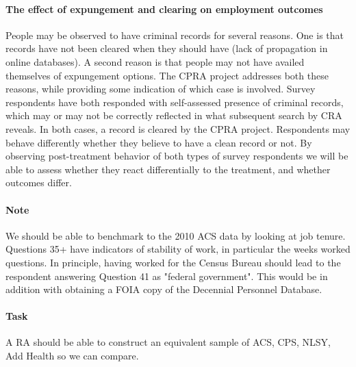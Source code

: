 \documentclass[letterpaper,man,biblatex]{apa6}
\begin{document}
\paragraph{The effect of expungement and clearing on employment outcomes} People may be observed to have criminal records for several reasons. One is that records have not been cleared when they should have (lack of propagation in online databases). A second reason is that people may not have availed themselves of expungement options. The CPRA project addresses both these reasons, while providing some indication of which case is involved. Survey respondents have both responded with self-assessed presence of criminal records, which may or may not be correctly reflected in what subsequent search by \ac{CRA} reveals. In both cases, a record is cleared by the CPRA project. Respondents may behave differently whether they believe to have a clean record or not. By observing post-treatment behavior of both types of survey respondents we will be able to assess whether they react differentially to the treatment, and whether outcomes differ. 

\paragraph{Note} We should be able to benchmark to the 2010 \ac{ACS} data by looking at job tenure. Questions 35+ \parencite{u.s._census_bureau_2010_2010} have indicators of stability of work, in particular the weeks worked questions. In principle, having worked for the Census Bureau should lead to the respondent answering Question 41 as "federal government". This would be in addition with obtaining a FOIA copy of the Decennial Personnel Database. 

\paragraph{Task} A RA should be able to construct an equivalent sample of ACS, CPS, NLSY, Add Health so we can compare.

%
\printbibliography[title={References}]
\end{document}
